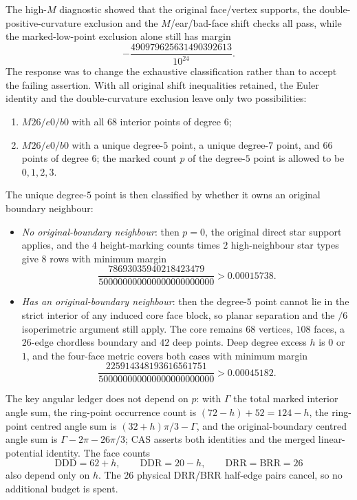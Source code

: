 The high-$M$ diagnostic showed that the original face/vertex supports, the double-positive-curvature
exclusion and the $M$/ear/bad-face shift checks all pass, while the marked-low-point exclusion alone
still has margin
\[
-\frac{490979625631490392613}{10^{24}} .
\]
The response was to change the exhaustive classification rather than to accept the failing
assertion. With all original shift inequalities retained, the Euler identity and the
double-curvature exclusion leave only two possibilities:
\begin{enumerate}[leftmargin=1.6em,itemsep=2pt]
\item $M26/e0/b0$ with all $68$ interior points of degree $6$;
\item $M26/e0/b0$ with a unique degree-$5$ point, a unique degree-$7$ point, and $66$ points of
degree $6$; the marked count $p$ of the degree-$5$ point is allowed to be $0,1,2,3$.
\end{enumerate}
The unique degree-$5$ point is then classified by whether it owns an original boundary neighbour:
\begin{itemize}[leftmargin=1.4em,itemsep=3pt]
\item \emph{No original-boundary neighbour}: then $p=0$, the original direct star support applies, and
the $4$ height-marking counts times $2$ high-neighbour star types give $8$ rows with minimum margin
\[
\frac{78693035940218423479}{500000000000000000000000}>0.00015738 .
\]
\item \emph{Has an original-boundary neighbour}: then the degree-$5$ point cannot lie in the strict
interior of any induced core face block, so planar separation and the $/6$ isoperimetric argument
still apply. The core remains $68$ vertices, $108$ faces, a $26$-edge chordless boundary and $42$
deep points. Deep degree excess $h$ is $0$ or $1$, and the four-face metric covers both cases with
minimum margin
\[
\frac{225914348193616561751}{500000000000000000000000}>0.00045182 .
\]
\end{itemize}
The key angular ledger does not depend on $p$: with $\Gamma$ the total marked interior angle sum, the
ring-point occurrence count is $(72-h)+52=124-h$, the ring-point centred angle sum is
$(32+h)\pi/3-\Gamma$, and the original-boundary centred angle sum is $\Gamma-2\pi-26\pi/3$; CAS
asserts both identities and the merged linear-potential identity. The face counts
\[
\mathrm{DDD}=62+h,\qquad \mathrm{DDR}=20-h,\qquad \mathrm{DRR}=\mathrm{BRR}=26
\]
also depend only on $h$. The $26$ physical DRR/BRR half-edge pairs cancel, so no additional budget
is spent.

